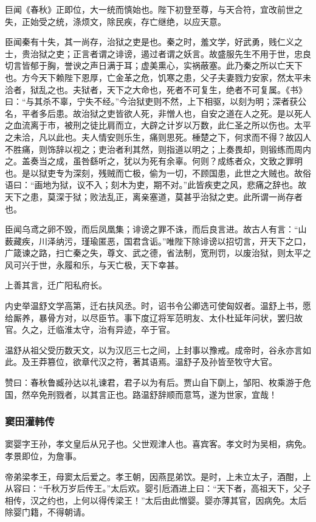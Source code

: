 \documentclass[]{article}
\begin{document}
巨闻《春秋》正即位，大一统而慎始也。陛下初登至尊，与天合符，宜改前世之失，正始受之统，涤烦文，除民疾，存亡继绝，以应天意。

臣闻秦有十失，其一尚存，治狱之吏是也。秦之时，羞文学，好武勇，贱仁义之士，贵治狱之吏；正言者谓之诽谤，遏过者谓之妖言。故盛服先生不用于世，忠良切言皆郁于胸，誉谀之声日满于耳；虚美熏心，实祸蔽塞。此乃秦之所以亡天下也。方今天下赖陛下恩厚，亡金革之危，饥寒之患，父子夫妻戮力安家，然太平未洽者，狱乱之也。夫狱者，天下之大命也，死者不可复生，绝者不可复属。《书》曰：``与其杀不辜，宁失不经。''今治狱吏则不然，上下相驱，以刻为明；深者获公名，平者多后患。故治狱之吏皆欲人死，非憎人也，自安之道在人之死。是以死人之血流离于市，被刑之徒比肩而立，大辟之计岁以万数，此仁圣之所以伤也。太平之未洽，凡以此也。夫人情安则乐生，痛则思死。棰楚之下，何求而不得？故囚人不胜痛，则饰辞以视之；吏治者利其然，则指道以明之；上奏畏却，则锻练而周内之。盖奏当之成，虽咎繇听之，犹以为死有余辜。何则？成练者众，文致之罪明也。是以狱吏专为深刻，残贼而亡极，偷为一切，不顾国患，此世之大贼也。故俗语曰：``画地为狱，议不入；刻木为吏，期不对。''此皆疾吏之风，悲痛之辞也。故天下之患，莫深于狱；败法乱正，离亲塞道，莫甚乎治狱之吏。此所谓一尚存者也。

臣闻乌鸢之卵不毁，而后凤凰集；诽谤之罪不诛，而后良言进。故古人有言：``山薮藏疾，川泽纳污，瑾瑜匿恶，国君含诟。''唯陛下除诽谤以招切言，开天下之口，广箴谏之路，扫亡秦之失，尊文、武之德，省法制，宽刑罚，以废治狱，则太平之风可兴于世，永履和乐，与天亡极，天下幸甚。

上善其言，迁广阳私府长。

内史举温舒文学高第，迁右扶风丞。时，诏书令公卿选可使匈奴者。温舒上书，愿给厮养，暴骨方对，以尽臣节。事下度辽将军范明友、太仆杜延年问状，罢归故官。久之，迁临淮太守，治有异迹，卒于官。

温舒从祖父受历数天文，以为汉厄三七之间，上封事以豫戒。成帝时，谷永亦言如此。及王莽篡位，欲章代汉之符，著其语焉。温舒子及孙皆至牧守大官。

赞曰：春秋鲁臧孙达以礼谏君，君子以为有后。贾山自下劘上，邹阳、枚乘游于危国，然卒免刑戮者，以其言正也。路温舒辞顺而意笃，遂为世家，宜哉！

\hypertarget{header-n4293}{%
\subsubsection{窦田灌韩传}\label{header-n4293}}

窦婴字王孙，孝文皇后从兄子也。父世观津人也。喜宾客。孝文时为吴相，病免。孝景即位，为詹事。

帝弟梁孝王，母窦太后爱之。孝王朝，因燕昆弟饮。是时，上未立太子，酒酣，上从容曰：``千秋万岁后传王。''太后欢。婴引卮酒进上曰：``天下者，高祖天下，父子相传，汉之约也，上何以得传梁王！''太后由此憎婴。婴亦薄其官，因病免。太后除婴门籍，不得朝请。
\end{document}
